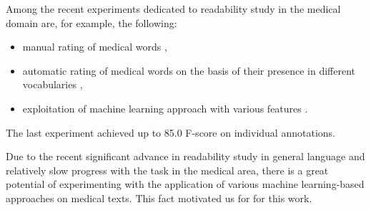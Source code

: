 Among the recent experiments dedicated to readability study in the medical domain are, for example, the following: 
\begin{itemize}
    \item manual rating of medical words \citep{Zheng-AMIA2002},
    \item automatic rating of medical words on the basis of their presence in different vocabularies \citep{Borst-MIE2008},
    \item exploitation of machine learning approach
    with various features \citep{Grabar-PITR2014}.
\end{itemize}
The last experiment achieved up to 85.0 F-score on individual annotations.

\bigskip
Due to the recent significant advance in readability study in general language and relatively slow progress with the task in the medical area, there is a great potential of experimenting with the application of various machine learning-based approaches on medical texts. This fact motivated us for for this work.
